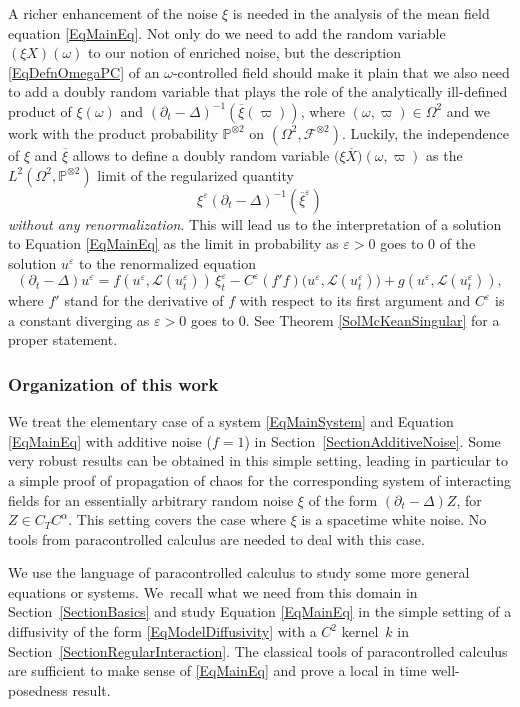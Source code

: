 \documentclass[JEP,XML,SOM,Unicode,published]{cedram}
\theoremstyle{definition}
\let\epsilon\varepsilon
\newcommand{\mcF}{\mathcal{F}}
\newcommand{\mcL}{\mathcal{L}}
\begin{document}
A richer enhancement of the noise $\xi$ is needed in the analysis of the mean field equation \eqref{EqMainEq}. Not only do we need to add the random variable $(\xi X)(\omega)$ to our notion of enriched noise, but the description \eqref{EqDefnOmegaPC} of an $\omega$\nobreakdash-controlled field should make it plain that we also need to add a doubly random variable that plays the role of the analytically ill-defined product of $\xi(\omega)$ and $(\partial_t-\Delta)^{-1}(\overline{\xi}(\varpi))$, where $(\omega,\varpi)\in\Omega^2$ and we work with the product probability $\mathbb{P}^{\otimes 2}$ on $(\Omega^2,\mcF^{\otimes 2})$. Luckily, the independence of $\xi$ and $\overline{\xi}$ allows to define a doubly random variable $\bigl(\xi \overline{X})(\omega,\varpi)$ as the $L^2(\Omega^2,\mathbb{P}^{\otimes 2})$ limit of the regularized quantity
\[
\xi^\epsilon(\partial_t-\Delta)^{-1}(\overline{\xi}^\epsilon)
\]
{\it without any renormalization}. This will lead us to the interpretation of a solution to Equation \eqref{EqMainEq} as the limit in probability as $\epsilon>0$ goes to $0$ of the solution $u^\epsilon$ to the renormalized equation
\[
(\partial_t-\Delta)u^\epsilon = f(u^\epsilon,\mcL(u^\epsilon_t))\,\xi^\epsilon_t - C^\epsilon (f'f)\bigl(u^\epsilon,\mcL(u^\epsilon_t)\bigr) + g(u^\epsilon,\mcL(u^\epsilon_t)),
\]
where $f'$ stand for the derivative of $f$ with respect to its first argument and $C^\epsilon$ is a constant diverging as $\epsilon>0$ goes to $0$. See Theorem \ref{SolMcKeanSingular} for a proper statement.

\subsubsection*{Organization of this work} We treat the elementary case of a system \eqref{EqMainSystem} and Equation \eqref{EqMainEq} with additive noise ($f=1$) in Section~\ref{SectionAdditiveNoise}. Some very robust results can be obtained in this simple setting, leading in particular to a simple proof of propagation of chaos for the corresponding system of interacting fields for an essentially arbitrary random noise $\xi$ of the form $(\partial_t-\Delta)Z$, for $Z\in C_TC^\alpha$. This setting covers the case where $\xi$ is a spacetime white noise. No tools from paracontrolled calculus are needed to deal with this case.

We use the language of paracontrolled calculus to study some more general equations or systems. We~recall what we need from this domain in Section~\ref{SectionBasics} and study Equation \eqref{EqMainEq} in the simple setting of a diffusivity of the form \eqref{EqModelDiffusivity} with a $C^2$ kernel~$k$ in Section~\ref{SectionRegularInteraction}. The classical tools of paracontrolled calculus are sufficient to make sense of \eqref{EqMainEq} and prove a local in time well-posedness result.
\end{document}
